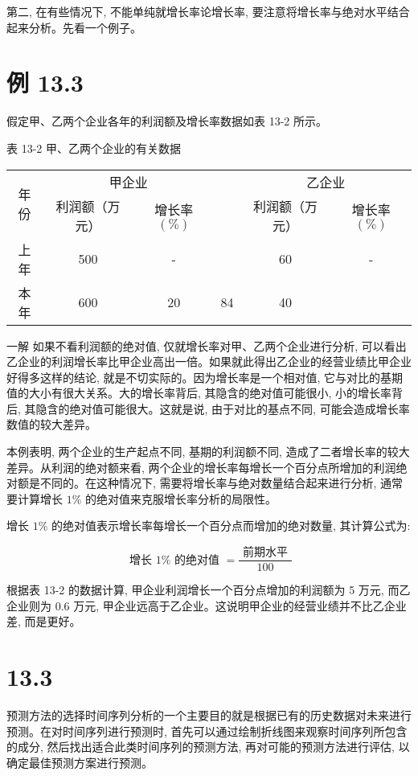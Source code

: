 \documentclass[10pt]{article}
\begin{document}
\begin{CJK*}{UTF8}{bsmi}
第二, 在有些情况下, 不能单纯就增长率论增长率, 要注意将增长率与绝对水平结合起来分析。先看一个例子。

\section*{例 13.3}
假定甲、乙两个企业各年的利润额及增长率数据如表 13-2 所示。

表 13-2 甲、乙两个企业的有关数据

\begin{center}
\begin{tabular}{cccccc}
\hline
\multirow{2}{*}{年份} & \multicolumn{2}{c}{甲企业} &  & \multicolumn{2}{c}{乙企业} \\
\cline { 2 - 3 }\cline { 5 - 6 }
 & 利润额（万元） & 增长率 $(\%)$ &  & 利润额（万元） & 增长率 $(\%)$ \\
\hline
上年 & 500 & - &  & 60 & - \\
本年 & 600 & 20 & 84 & 40 &  \\
\hline
\end{tabular}
\end{center}

一解 如果不看利润额的绝对值, 仅就增长率对甲、乙两个企业进行分析, 可以看出乙企业的利润增长率比甲企业高出一倍。如果就此得出乙企业的经营业绩比甲企业好得多这样的结论, 就是不切实际的。因为增长率是一个相对值, 它与对比的基期值的大小有很大关系。大的增长率背后, 其隐含的绝对值可能很小, 小的增长率背后, 其隐含的绝对值可能很大。这就是说, 由于对比的基点不同, 可能会造成增长率数值的较大差异。

本例表明, 两个企业的生产起点不同, 基期的利润额不同, 造成了二者增长率的较大差异。从利润的绝对额来看, 两个企业的增长率每增长一个百分点所增加的利润绝对额是不同的。在这种情况下, 需要将增长率与绝对数量结合起来进行分析, 通常要计算增长 $1 \%$ 的绝对值来克服增长率分析的局限性。

增长 $1 \%$ 的绝对值表示增长率每增长一个百分点而增加的绝对数量, 其计算公式为:


\begin{equation*}
\text { 增长 } 1 \% \text { 的绝对值 }=\frac{\text { 前期水平 }}{100} \tag{13.5}
\end{equation*}


根据表 13-2 的数据计算, 甲企业利润增长一个百分点增加的利润额为 5 万元, 而乙企业则为 0.6 万元, 甲企业远高于乙企业。这说明甲企业的经营业绩并不比乙企业差, 而是更好。

\section*{13.3}
预测方法的选择时间序列分析的一个主要目的就是根据已有的历史数据对未来进行预测。在对时间序列进行预测时, 首先可以通过绘制折线图来观察时间序列所包含的成分, 然后找出适合此类时间序列的预测方法, 再对可能的预测方法进行评估, 以确定最佳预测方案进行预测。


\end{CJK*}
\end{document}
